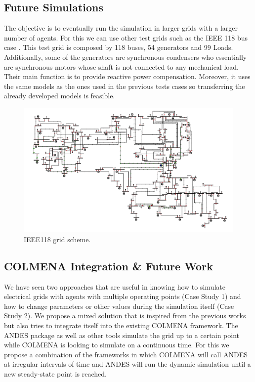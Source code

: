 \documentclass{report}
\begin{document}
\subsection{Future Simulations}

The objective is to eventually run the simulation in larger grids with a larger number of agents. For this we can use other test grids such as the IEEE 118 bus case \cite{grids:ieee118}. This test grid is composed by 118 buses, 54 generators and 99 Loads. Additionally, some of the generators are synchronous condensers who essentially are synchronous motors whose shaft is not connected to any mechanical load. Their main function is to provide reactive power compensation. Moreover, it uses the same models as the ones used in the previous tests cases so transferring the already developed models is feasible.

\begin{figure}[h!]
    \centering
    \includegraphics[width=1\textwidth]{pictures/IEEE118.png}
    \caption{IEEE118 grid scheme. \cite{grids:ieee118}}
    \label{fig:kundur}
\end{figure}

\subsection{COLMENA Integration \& Future Work}

We have seen two approaches that are useful in knowing how to simulate electrical grids with agents with multiple operating points (Case Study 1) and how to change parameters or other values during the simulation itself (Case Study 2). We propose a mixed solution that is inspired from the previous works but also tries to integrate itself into the existing COLMENA framework. The ANDES package as well as other tools simulate the grid up to a certain point while COLMENA is looking to simulate on a continuous time. For this we propose a combination of the frameworks in which COLMENA will call ANDES at irregular intervals of time and ANDES will run the dynamic simulation until a new steady-state point is reached. \\
\end{document}
